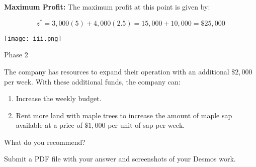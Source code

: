 \documentclass[12pt]{article}
\begin{document}
\textbf{Maximum Profit:}  
The maximum profit at this point is given by:

\[
z^* = 3,000(5) + 4,000(2.5) = 15,000 + 10,000 = \$25,000
\]

\texttt{[image: iii.png]}

\pagebreak
\noindent \begin{huge}Phase 2\end{huge}
\newline

\noindent  The company has resources to expand their operation with an additional $\$2,000$ per week.  With these additional funds, the company can:

\begin{enumerate}
	\item Increase the weekly budget.
	\item Rent more land with maple trees to increase the amount of maple sap available at a price of $\$1,000$ per unit of sap per week.
\end{enumerate}

\noindent What do you recommend?
\newline

\noindent Submit a PDF file with your answer and screenshots of your Desmos work.
\end{document}
